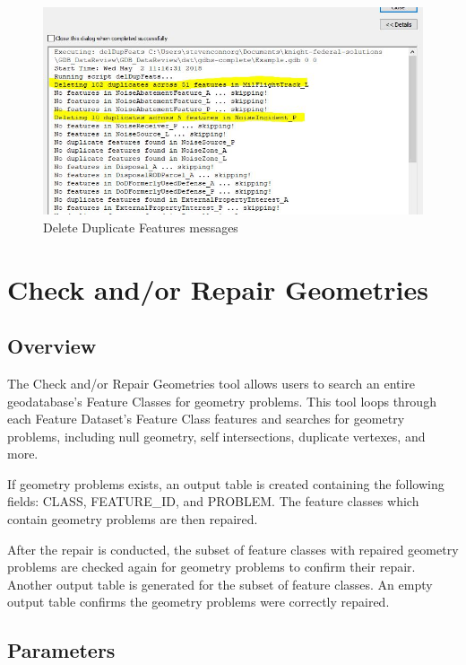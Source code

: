 \documentclass[openany]{book}
\theoremstyle{definition}
\theoremstyle{definition}
\theoremstyle{definition}
\theoremstyle{remark}
\begin{document}
\begin{figure}[H]

{\centering \includegraphics{figures/delF-messages} 

}

\caption{Delete Duplicate Features messages}\label{fig:delFmessages}
\end{figure}

\hypertarget{chkGeom}{\chapter{Check and/or Repair
Geometries}\label{chkGeom}}

\section{Overview}\label{overview-4}

The Check and/or Repair Geometries tool allows users to search an entire
geodatabase's Feature Classes for geometry problems. This tool loops
through each Feature Dataset's Feature Class features and searches for
geometry problems, including null geometry, self intersections,
duplicate vertexes, and more.

If geometry problems exists, an output table is created containing the
following fields: CLASS, FEATURE\_ID, and PROBLEM. The feature classes
which contain geometry problems are then repaired.

After the repair is conducted, the subset of feature classes with
repaired geometry problems are checked again for geometry problems to
confirm their repair. Another output table is generated for the subset
of feature classes. An empty output table confirms the geometry problems
were correctly repaired.

\section{Parameters}\label{parameters-4}
\end{document}
